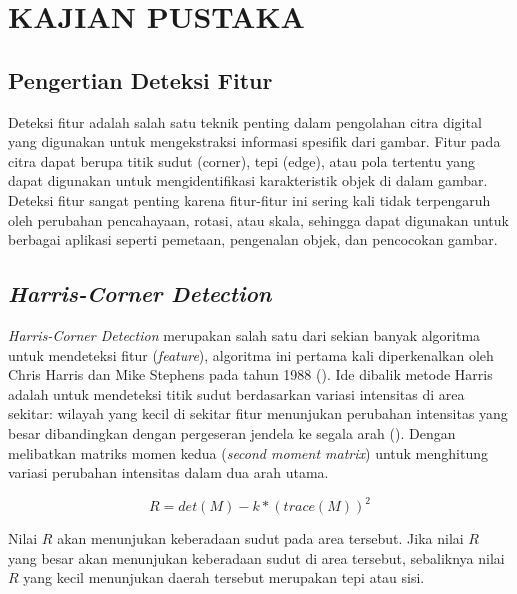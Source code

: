 
\chapter{KAJIAN PUSTAKA}

\section{Pengertian Deteksi Fitur}
  Deteksi fitur adalah salah satu teknik penting dalam pengolahan citra digital yang digunakan untuk mengekstraksi informasi spesifik dari gambar. 
Fitur pada citra dapat berupa titik sudut (corner), tepi (edge), atau pola tertentu yang dapat digunakan untuk mengidentifikasi karakteristik objek di dalam gambar. 
Deteksi fitur sangat penting karena fitur-fitur ini sering kali tidak terpengaruh oleh perubahan pencahayaan, rotasi, atau skala, sehingga dapat digunakan untuk berbagai aplikasi seperti pemetaan, pengenalan objek, dan pencocokan gambar.

\section{\emph{Harris-Corner Detection}}
  \emph{Harris-Corner Detection} merupakan salah satu dari sekian banyak algoritma untuk mendeteksi fitur (\emph{feature}), algoritma ini pertama kali diperkenalkan oleh Chris Harris dan Mike Stephens pada tahun 1988 (\cite{Harris2013}). 
Ide dibalik metode Harris adalah untuk mendeteksi titik sudut berdasarkan variasi intensitas di area sekitar: wilayah yang kecil di sekitar fitur menunjukan perubahan intensitas yang besar dibandingkan dengan pergeseran jendela ke segala arah (\cite{Sanchez2018}).
Dengan melibatkan matriks momen kedua (\emph{second moment matrix}) untuk menghitung variasi perubahan intensitas dalam dua arah utama.

\begin{equation}
  R = det(M) - k * (trace(M))^2
  \label{HarrisCorner}
\end{equation}

  Nilai \(R\) akan menunjukan keberadaan sudut pada area tersebut. 
Jika nilai \(R\) yang besar akan menunjukan keberadaan sudut di area tersebut, sebaliknya nilai \(R\) yang kecil menunjukan daerah tersebut merupakan tepi atau sisi.

